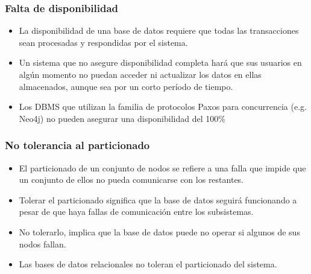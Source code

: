 \begin{frame}
\frametitle{Falta de disponibilidad}
\begin{itemize}

	\item	La disponibilidad de una base de datos requiere que todas las transacciones sean procesadas y respondidas por el sistema. \pause
	\item	Un sistema que no asegure disponibilidad completa hará que sus usuarios en algún momento no puedan acceder ni actualizar los datos en ellas almacenados, aunque sea por un corto período de tiempo. \pause
	\item	Los DBMS que utilizan la familia de protocolos Paxos para concurrencia (e.g. Neo4j) no pueden asegurar una disponibilidad del 100\%

\end{itemize}
\end{frame}

\begin{frame}
\frametitle{No tolerancia al particionado}
\begin{itemize}

	\item	El particionado de un conjunto de nodos se refiere a una falla que impide que un conjunto de ellos no pueda comunicarse con los restantes. \pause
	\item	Tolerar el particionado significa que la base de datos seguirá funcionando a pesar de que haya fallas de comunicación entre los subsistemas. \pause
	\item	No tolerarlo, implica que la base de datos puede no operar si algunos de sus nodos fallan. \pause
	\item	Las bases de datos relacionales no toleran el particionado del sistema.
	
\end{itemize}
\end{frame}

